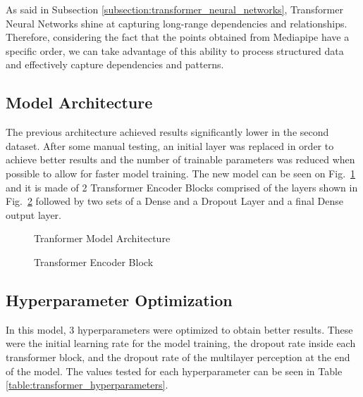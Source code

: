 As said in Subsection \ref{subsection:transformer_neural_networks}, Transformer Neural Networks shine at capturing long-range dependencies and relationships. Therefore, considering the fact that the points obtained from Mediapipe have a specific order, we can take advantage of this ability to process structured data and effectively capture dependencies and patterns.

\subsection{Model Architecture}

The previous architecture achieved results significantly lower in the second dataset. After some manual testing, an initial layer was replaced in order to achieve better results and the number of trainable parameters was reduced when possible to allow for faster model training. The new model can be seen on Fig.~\ref{fig:transformer_architecture2} and it is made of 2 Transformer Encoder Blocks comprised of the layers shown in Fig.~\ref{fig:transformer_architecture1} followed by two sets of a Dense and a Dropout Layer and a final Dense output layer.

\begin{figure}[H]
    \centering
    {\fontsize{10}{12}\selectfont}
    \caption[Tranformer Model Architecture]{Tranformer Model Architecture}
    \label{fig:transformer_architecture2}
\end{figure}

\begin{figure}[H]
    \centering
    {\fontsize{10}{12}\selectfont}
    \caption[Transformer Encoder Block]{Transformer Encoder Block}
    \label{fig:transformer_architecture1}
\end{figure}

\subsection{Hyperparameter Optimization}

In this model, 3 hyperparameters were optimized to obtain better results. These were the initial learning rate for the model training, the dropout rate inside each transformer block, and the dropout rate of the multilayer perception at the end of the model. The values tested for each hyperparameter can be seen in Table \ref{table:transformer_hyperparameters}.

